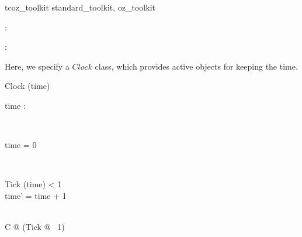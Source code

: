 \begin{zsection}
  \SECTION tcoz\_toolkit \parents standard\_toolkit, oz\_toolkit
\end{zsection}
















\begin{axdef}
  \atime : \power \arithmos
\end{axdef}

\begin{axdef}
  \delta : \atime
\end{axdef}

Here, we specify a $Clock$ class, which provides active objects for
keeping the time.

\begin{class}{Clock}
\project (time)\\
\begin{state}
  time : \atime
\end{state}\\
\begin{init}
  time = 0
\end{init}\\
\begin{op}{Tick}
  \Delta (time)
\where
  \delta < 1\\
  time' = time + 1
\end{op}\\
\Main \sdef \mu C @ (Tick @ \WaitUntil~1) %
\end{class}

